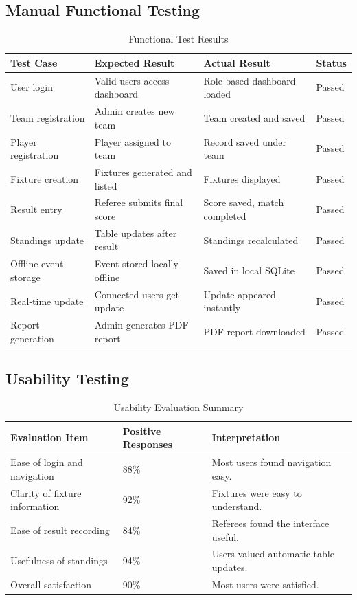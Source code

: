 \documentclass[12pt,a4paper]{report}
\begin{document}
\subsection{Manual Functional Testing}
\begin{table}[H]
\centering
\caption{Functional Test Results}
\begin{tabular}{p{3.5cm}p{4.5cm}p{3.5cm}p{2cm}}
\toprule
\textbf{Test Case} & \textbf{Expected Result} & \textbf{Actual Result} & \textbf{Status}\\
\midrule
User login & Valid users access dashboard & Role-based dashboard loaded & Passed\\
Team registration & Admin creates new team & Team created and saved & Passed\\
Player registration & Player assigned to team & Record saved under team & Passed\\
Fixture creation & Fixtures generated and listed & Fixtures displayed & Passed\\
Result entry & Referee submits final score & Score saved, match completed & Passed\\
Standings update & Table updates after result & Standings recalculated & Passed\\
Offline event storage & Event stored locally offline & Saved in local SQLite & Passed\\
Real-time update & Connected users get update & Update appeared instantly & Passed\\
Report generation & Admin generates PDF report & PDF report downloaded & Passed\\
\bottomrule
\end{tabular}
\end{table}

\subsection{Usability Testing}
\begin{table}[H]
\centering
\caption{Usability Evaluation Summary}
\begin{tabular}{p{6cm}p{4cm}p{4cm}}
\toprule
\textbf{Evaluation Item} & \textbf{Positive Responses} & \textbf{Interpretation}\\
\midrule
Ease of login and navigation & 88\% & Most users found navigation easy.\\
Clarity of fixture information & 92\% & Fixtures were easy to understand.\\
Ease of result recording & 84\% & Referees found the interface useful.\\
Usefulness of standings & 94\% & Users valued automatic table updates.\\
Overall satisfaction & 90\% & Most users were satisfied.\\
\bottomrule
\end{tabular}
\end{table}
\end{document}
